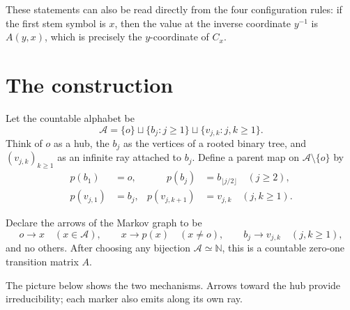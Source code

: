 \documentclass[11pt]{article}
\begin{document}
These statements can also be read directly from the four configuration rules:
if the first stem symbol is $x$, then the value at the inverse coordinate
$y^{-1}$ is $A(y,x)$, which is precisely the $y$-coordinate of $C_x$.

\section{The construction}

Let the countable alphabet be
\[
 \mathcal A=\{o\}\sqcup\{b_j:j\geq1\}
 \sqcup\{v_{j,k}:j,k\geq1\}.
\]
Think of $o$ as a hub, the $b_j$ as the vertices of a rooted binary tree,
and $(v_{j,k})_{k\geq1}$ as an infinite ray attached to $b_j$.
Define a parent map on $\mathcal A\setminus\{o\}$ by
\[
\begin{alignedat}{2}
 p(b_1)&=o, &\qquad p(b_j)&=b_{\lfloor j/2\rfloor}\quad(j\geq2),\\
 p(v_{j,1})&=b_j, & p(v_{j,k+1})&=v_{j,k}\quad(j,k\geq1).
 \end{alignedat}
\]

Declare the arrows of the Markov graph to be
\[
 o\longrightarrow x\quad(x\in\mathcal A),\qquad
 x\longrightarrow p(x)\quad(x\ne o),\qquad
 b_j\longrightarrow v_{j,k}\quad(j,k\geq1),
\]
and no others.  After choosing any bijection $\mathcal A\simeq\mathbb N$,
this is a countable zero-one transition matrix $A$.

The picture below shows the two mechanisms.  Arrows toward the hub provide
irreducibility; each marker also emits along its own ray.

\begin{center}
\end{center}
\end{document}
